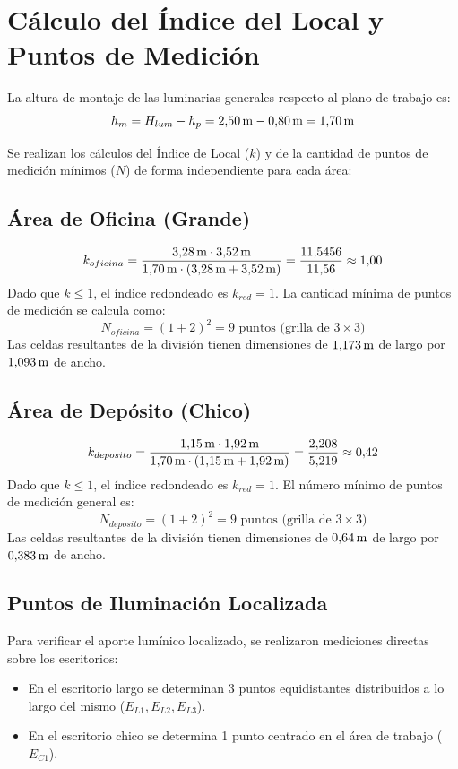\section{Cálculo del Índice del Local y Puntos de Medición}
\label{sec.tp2:calculo_grilla}

La altura de montaje de las luminarias generales respecto al plano de trabajo es:
\begin{equation}
    h_m = H_{lum} - h_p = 2{,}50\,\mathrm{m} - 0{,}80\,\mathrm{m} = 1{,}70\,\mathrm{m}
\end{equation}

Se realizan los cálculos del Índice de Local ($k$) y de la cantidad de puntos de medición mínimos ($N$) de forma independiente para cada área:

\subsection{Área de Oficina (Grande)}
\begin{equation}
    k_{oficina} = \frac{3{,}28\,\mathrm{m} \cdot 3{,}52\,\mathrm{m}}{1{,}70\,\mathrm{m} \cdot (3{,}28\,\mathrm{m} + 3{,}52\,\mathrm{m})} = \frac{11{,}5456}{11{,}56} \approx 1{,}00
\end{equation}
Dado que $k \le 1$, el índice redondeado es $k_{red} = 1$. La cantidad mínima de puntos de medición se calcula como:
\begin{equation}
    N_{oficina} = (1 + 2)^2 = 9\text{ puntos (grilla de } 3 \times 3\text{)}
\end{equation}
Las celdas resultantes de la división tienen dimensiones de $1{,}173\,\mathrm{m}$ de largo por $1{,}093\,\mathrm{m}$ de ancho.

\subsection{Área de Depósito (Chico)}
\begin{equation}
    k_{deposito} = \frac{1{,}15\,\mathrm{m} \cdot 1{,}92\,\mathrm{m}}{1{,}70\,\mathrm{m} \cdot (1{,}15\,\mathrm{m} + 1{,}92\,\mathrm{m})} = \frac{2{,}208}{5{,}219} \approx 0{,}42
\end{equation}
Dado que $k \le 1$, el índice redondeado es $k_{red} = 1$. El número mínimo de puntos de medición general es:
\begin{equation}
    N_{deposito} = (1 + 2)^2 = 9\text{ puntos (grilla de } 3 \times 3\text{)}
\end{equation}
Las celdas resultantes de la división tienen dimensiones de $0{,}64\,\mathrm{m}$ de largo por $0{,}383\,\mathrm{m}$ de ancho.

\subsection{Puntos de Iluminación Localizada}
Para verificar el aporte lumínico localizado, se realizaron mediciones directas sobre los escritorios:
\begin{itemize}
    \item En el escritorio largo se determinan 3 puntos equidistantes distribuidos a lo largo del mismo ($E_{L1}, E_{L2}, E_{L3}$).
    \item En el escritorio chico se determina 1 punto centrado en el área de trabajo ($E_{C1}$).
\end{itemize}

